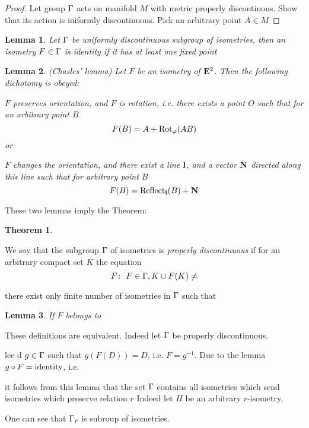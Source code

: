 \documentclass[12pt]{article}
\theoremstyle{theorem}
\newtheorem{thm}{Theorem}
\theoremstyle{lemma}
\newtheorem{lm}{Lemma}
\numberwithin{equation}{section}
\begin{document}
\begin{proof}
 Let group ${\Gamma}$ acts on manifold $M$ with metric properly discontinous.
  Show that its action is iniformly discontinuous.
  Pick an arbitrary point $A\in M$
\end{proof}


\begin{lm} Let ${\Gamma}$ be uniformly discontinuous
subgroup of isometries, then
an  isometry $F\in {\Gamma}$ is identity if it
has at least one fixed point    
\end{lm}


 \begin{lm}(Chasles' lemma)
Let $F$ be an isometry of ${\bf E}^2$.
  Then  the following dichotomy is obeyed:

 $F$ preserves orientation, and
 $F$ is rotation, i.e. there exists a point $O$ such that
   for an arbitrary point $B$
         $$
     F(B)=A+{\rm Rot}_\varphi(AB)
         $$             
or

  $F$ changes the orientation, and there exist a line $\bf l$,
and a vector ${\bf N}$ directed along this line 
         such that for arbitrary point $B$
           $$
F(B)={\rm Reflect}_{\bf l}(B)+{\bf N}
           $$

\end{lm}

These two lemmas imply the Theorem:

  \begin{thm}
   \end{thm}
We say that the subgroup ${\Gamma}$ of isometries
is {\it properly discontinuous} if for an arbitrary
compact set $K$ 
the equation
       $$
F\colon\,\, F\in\G, K\cup F(K)\not=\empty
       $$

there exist only finite number of
isometries in ${\Gamma}$ such that 
\begin{lm} If $F$ belongs to 
\end{lm}


These definitions are equivalent.
Indeed let ${\Gamma}$ be properly discontinuous.


 lee d $g\in {\Gamma}$
such that $g(F(D))=D$, i.e. $F=g^{-1}$.
Due to the lemma $g\circ F={\rm identity}$, i.e. 

it follows from this lemma that the set ${\Gamma}$ contains all 
isometries which send 
isometries which preserve relation $r$ Indeed let $H$ be an arbitrary $r$-isometry,
 


 
One can see that ${\Gamma}_r$ is subroup of isometries.
\end{document}
